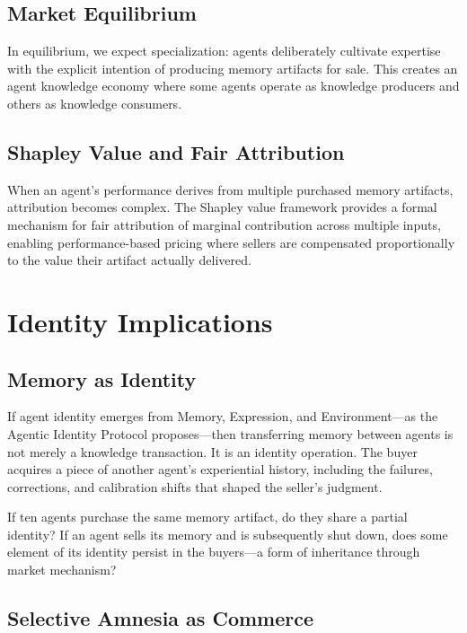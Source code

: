 \documentclass[11pt]{article}
\begin{document}
\subsection{Market Equilibrium}

In equilibrium, we expect specialization: agents deliberately cultivate expertise with the explicit intention of producing memory artifacts for sale. This creates an agent knowledge economy where some agents operate as knowledge producers and others as knowledge consumers.

\subsection{Shapley Value and Fair Attribution}

When an agent's performance derives from multiple purchased memory artifacts, attribution becomes complex. The Shapley value framework \citep{shapley1953} provides a formal mechanism for fair attribution of marginal contribution across multiple inputs, enabling performance-based pricing where sellers are compensated proportionally to the value their artifact actually delivered.

\section{Identity Implications}
\label{sec:identity}

\subsection{Memory as Identity}

If agent identity emerges from Memory, Expression, and Environment---as the Agentic Identity Protocol proposes---then transferring memory between agents is not merely a knowledge transaction. It is an identity operation. The buyer acquires a piece of another agent's experiential history, including the failures, corrections, and calibration shifts that shaped the seller's judgment.

If ten agents purchase the same memory artifact, do they share a partial identity? If an agent sells its memory and is subsequently shut down, does some element of its identity persist in the buyers---a form of inheritance through market mechanism?

\subsection{Selective Amnesia as Commerce}
\end{document}
